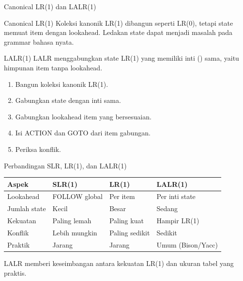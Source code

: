 \documentclass[aspectratio=169,10pt,t]{beamer}
\begin{document}
\begin{frame}{Canonical LR(1) dan LALR(1)}
  \begin{block}{Canonical LR(1)}
    \small
    Koleksi kanonik LR(1) dibangun seperti LR(0), tetapi state memuat
    item dengan lookahead. Ledakan state dapat menjadi masalah pada
    grammar bahasa nyata.
  \end{block}

  \begin{block}{LALR(1)}
    \small
    LALR menggabungkan state LR(1) yang memiliki inti ()
    sama, yaitu himpunan item tanpa lookahead.
  \end{block}

  \begin{enumerate}
    \setlength{\itemsep}{1pt}
    \item Bangun koleksi kanonik LR(1).
    \item Gabungkan state dengan inti sama.
    \item Gabungkan lookahead item yang bersesuaian.
    \item Isi ACTION dan GOTO dari item gabungan.
    \item Periksa konflik.
  \end{enumerate}
\end{frame}

\begin{frame}{Perbandingan SLR, LR(1), dan LALR(1)}
  \small
  \setlength{\tabcolsep}{4pt}
  \begin{tabular}{@{}p{2.6cm}p{3.6cm}p{3.6cm}p{3.8cm}@{}}
    \toprule
    \textbf{Aspek} & \textbf{SLR(1)} & \textbf{LR(1)} &
      \textbf{LALR(1)} \\
    \midrule
    Lookahead & FOLLOW global & Per item & Per inti state \\
    Jumlah state & Kecil & Besar & Sedang \\
    Kekuatan & Paling lemah & Paling kuat & Hampir LR(1) \\
    Konflik & Lebih mungkin & Paling sedikit & Sedikit \\
    Praktik & Jarang & Jarang & Umum (Bison/Yacc) \\
    \bottomrule
  \end{tabular}

  \vspace{4pt}
  {\footnotesize\color{ubbblue!80}LALR memberi keseimbangan antara
  kekuatan LR(1) dan ukuran tabel yang praktis.}
\end{frame}
\end{document}

